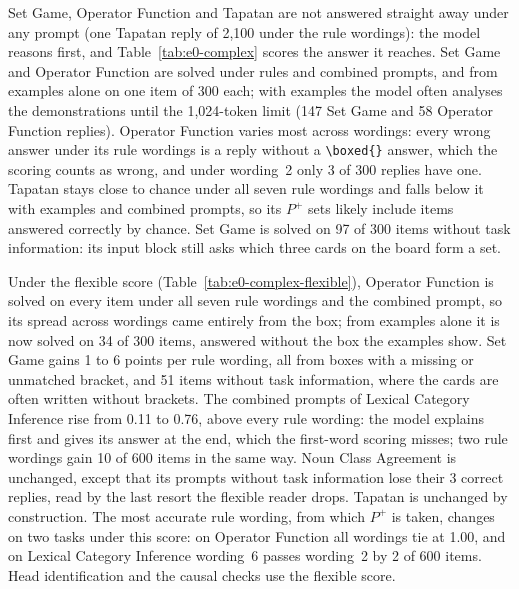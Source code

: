 \documentclass[11pt,a4paper]{article}
\begin{document}
Set Game, Operator Function and Tapatan are not answered straight away under any prompt (one Tapatan reply of 2,100 under the rule wordings): the model reasons first, and Table~\ref{tab:e0-complex} scores the answer it reaches. Set Game and Operator Function are solved under rules and combined prompts, and from examples alone on one item of 300 each; with examples the model often analyses the demonstrations until the 1,024-token limit (147 Set Game and 58 Operator Function replies). Operator Function varies most across wordings: every wrong answer under its rule wordings is a reply without a \texttt{\textbackslash boxed\{\}} answer, which the scoring counts as wrong, and under wording~2 only 3 of 300 replies have one. Tapatan stays close to chance under all seven rule wordings and falls below it with examples and combined prompts, so its $P^{+}$ sets likely include items answered correctly by chance. Set Game is solved on 97 of 300 items without task information: its input block still asks which three cards on the board form a set.

Under the flexible score (Table~\ref{tab:e0-complex-flexible}), Operator Function is solved on every item under all seven rule wordings and the combined prompt, so its spread across wordings came entirely from the box; from examples alone it is now solved on 34 of 300 items, answered without the box the examples show. Set Game gains 1 to 6 points per rule wording, all from boxes with a missing or unmatched bracket, and 51 items without task information, where the cards are often written without brackets. The combined prompts of Lexical Category Inference rise from 0.11 to 0.76, above every rule wording: the model explains first and gives its answer at the end, which the first-word scoring misses; two rule wordings gain 10 of 600 items in the same way. Noun Class Agreement is unchanged, except that its prompts without task information lose their 3 correct replies, read by the last resort the flexible reader drops. Tapatan is unchanged by construction. The most accurate rule wording, from which $P^{+}$ is taken, changes on two tasks under this score: on Operator Function all wordings tie at 1.00, and on Lexical Category Inference wording~6 passes wording~2 by 2 of 600 items. Head identification and the causal checks use the flexible score.

\begin{table}[tbp]
\centering\footnotesize\setlength{\tabcolsep}{3.5pt}

\caption{E0, complex tasks at the easy level: strict accuracy per prompt, on the whole reply up to 1,024 tokens (Sec.~\ref{sec:reasoning}). Rule: the original rules prompt (orig.) and the six added wordings (w1--6: mean, and range). No task info: the prompt without task information. Chance: share of the most frequent label for the tasks with a fixed label set, 0 for open answers.}
\label{tab:e0-complex}
\end{table}
\end{document}
